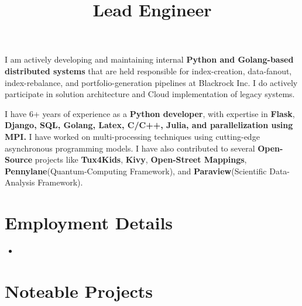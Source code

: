 \documentclass[11pt,a4paper,sans]{moderncv}        %
\title{Lead Engineer}                               %
\begin{document}
\makecvtitle

\small{I am actively developing and maintaining internal \textbf{Python and Golang-based distributed systems} that are held
responsible for index-creation, data-fanout, index-rebalance, and portfolio-generation pipelines at Blackrock Inc. I do
actively participate in solution architecture and Cloud implementation of legacy systems.


I have 6+ years of experience as a \textbf{Python developer}, with expertise in \textbf{Flask}, \textbf{Django, SQL, Golang, Latex, C/C++,
Julia, and parallelization using MPI.} I have worked on multi-processing techniques using cutting-edge asynchronous
programming models. I have also contributed to several \textbf{Open-Source} projects like \textbf{Tux4Kids}, \textbf{Kivy}, \textbf{Open-Street
Mappings}, \textbf{Pennylane}(Quantum-Computing Framework), and \textbf{Paraview}(Scientific Data-Analysis Framework).


\section{Employment Details}

\vspace{6pt}

\begin{itemize}

\item{
{\vspace{3pt}
}}
\vspace{6pt}

\end{itemize}



\section{Noteable Projects}

}
\end{document}
